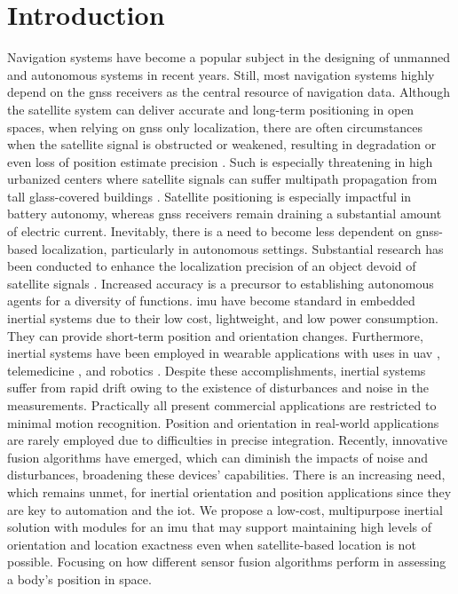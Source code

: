 \section{Introduction}
Navigation systems have become a popular subject in the designing of unmanned and autonomous systems in recent years. Still, most navigation systems highly depend on the \acrfull{gnss} receivers as the central resource of navigation data. Although the satellite system can deliver accurate and long-term positioning in open spaces, when relying on \acrshort{gnss} only localization, there are often circumstances when the satellite signal is obstructed or weakened, resulting in degradation or even loss of position estimate precision \cite{ioannides2016known}. Such is especially threatening in high urbanized centers where satellite signals can suffer multipath propagation from tall glass-covered buildings \cite{omar2016integration}. Satellite positioning is especially impactful in battery autonomy, whereas \acrshort{gnss} receivers remain draining a substantial amount of electric current. Inevitably, there is a need to become less dependent on \acrshort{gnss}-based localization, particularly in autonomous settings. Substantial research has been conducted to enhance the localization precision of an object devoid of satellite signals \cite{nassar2004improving}\cite{dewhirst2016improving}\cite{kao1991integration}\cite{coyte2013displacement}\cite{wong1988high}. Increased accuracy is a precursor to establishing autonomous agents for a diversity of functions. \acrfull{imu} have become standard in embedded inertial systems due to their low cost, lightweight, and low power consumption. They can provide short-term position and orientation changes. Furthermore, inertial systems have been employed in wearable applications with uses in \acrfull{uav} \cite{hetenyi2016sensor}\cite{luo2013uav}\cite{sharma2014sensor}, telemedicine \cite{madgwick2020extended}, and robotics \cite{wilson2019formulation}. Despite these accomplishments, inertial systems suffer from rapid drift owing to the existence of disturbances and noise in the measurements. Practically all present commercial applications are restricted to minimal motion recognition. Position and orientation in real-world applications are rarely employed due to difficulties in precise integration. Recently, innovative fusion algorithms have emerged, which can diminish the impacts of noise and disturbances, broadening these devices' capabilities. There is an increasing need, which remains unmet, for inertial orientation and position applications since they are key to automation and the \acrfull{iot}.
We propose a low-cost, multipurpose inertial solution with modules for an \acrfull{imu} that may support maintaining high levels of orientation and location exactness even when satellite-based location is not possible. Focusing on how different sensor fusion algorithms perform in assessing a body's position in space.

